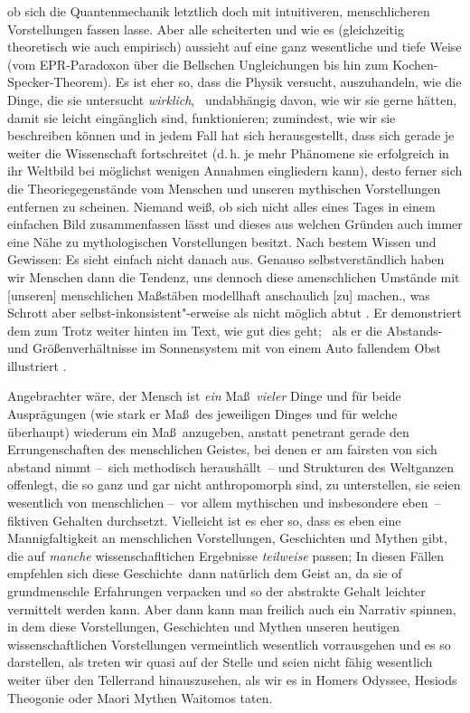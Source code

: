   ob sich die Quantenmechanik letztlich doch mit intuitiveren, menschlicheren
  Vorstellungen fassen lasse.
Aber alle scheiterten und wie es (gleichzeitig
  theoretisch wie auch empirisch) aussieht auf eine ganz wesentliche und tiefe Weise
  (vom EPR-Paradoxon über die Bellschen Ungleichungen bis hin zum
  \mbox{Kochen-Specker-Theorem}).
Es ist eher so, dass die Physik versucht, auszuhandeln, wie die Dinge, die sie
  untersucht \emph{wirklich}, \dhei\ undabhängig davon, wie wir sie gerne hätten,
  damit sie leicht eingänglich sind, funktionieren; zumindest, wie wir sie beschreiben können
  und in jedem Fall hat sich herausgestellt, dass sich gerade je weiter die
  Wissenschaft fortschreitet (d.\,h. je mehr Phänomene sie erfolgreich in ihr
  Weltbild bei möglichst wenigen Annahmen eingliedern kann), desto ferner
  sich die Theoriegegenstände vom Menschen und unseren mythischen
  Vorstellungen entfernen zu scheinen.
Niemand weiß, ob sich nicht alles eines Tages in einem einfachen Bild
  zusammenfassen lässt und dieses aus welchen Gründen auch immer eine Nähe zu
  mythologischen Vorstellungen besitzt.
Nach bestem Wissen und Gewissen: Es sieht einfach nicht danach aus.
Genauso selbstverständlich haben wir Menschen dann die Tendenz, uns dennoch
  diese amenschlichen Umstände \glqq mit [unseren] menschlichen Maßstäben
  modellhaft anschaulich [zu] machen.\grqq, was Schrott aber
  selbst-inkonsistent"-erweise als nicht möglich abtut \citep[vgl. S. 5]{Schrott2016ErsteErde}. 
Er demonstriert dem zum Trotz weiter hinten im Text, wie gut dies geht; \ZB\
  als er die Abstands- und Größenverhältnisse im Sonnensystem mit von einem Auto fallendem
  Obst illustriert \citep[S. 48 f.]{Schrott2016ErsteErde}.


Angebrachter wäre, der Mensch ist \emph{ein} Ma\ss\ \emph{vieler} Dinge und für beide
  Ausprägungen (wie stark er Ma\ss\ des jeweiligen Dinges und für welche
  überhaupt) wiederum ein Ma\ss\ anzugeben, anstatt penetrant gerade den
  Errungenschaften des menschlichen Geistes, bei denen er am fairsten von sich
  abstand nimmt --~sich methodisch heraushällt~-- und Strukturen des
  Weltganzen offenlegt, die so ganz und gar nicht anthropomorph sind, zu
  unterstellen, sie seien wesentlich von menschlichen --~vor allem
  mythischen und insbesondere eben~-- fiktiven Gehalten durchsetzt.
Vielleicht ist es eher so, dass es eben eine Mannigfaltigkeit an menschlichen
  Vorstellungen, Geschichten und Mythen gibt, die auf \emph{manche}
  wissenschafltichen Ergebnisse \emph{teilweise} passen; In diesen Fällen
  empfehlen sich diese \glqq Geschichte\grqq\ dann natürlich dem Geist an, da
  sie of grundmenschle Erfahrungen verpacken und so der abstrakte Gehalt
  leichter vermittelt werden kann.
Aber dann kann man freilich auch ein Narrativ spinnen, in dem diese Vorstellungen,
  Geschichten und Mythen unseren heutigen wissenschaftlichen Vorstellungen vermeintlich
  wesentlich vorrausgehen und es so darstellen, als treten wir quasi auf der Stelle und
  seien nicht fähig wesentlich weiter über den Tellerrand hinauszusehen, als
  wir es in Homers Odyssee, Hesiods Theogonie oder Maori Mythen Waitomos taten.
